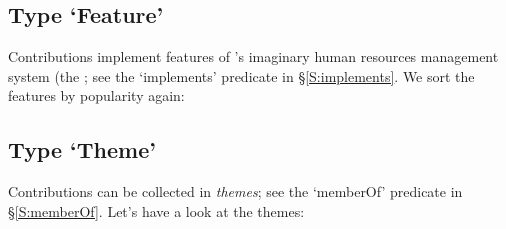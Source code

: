 

\subsection{Type `Feature'}

Contributions implement features of \ooo{}'s imaginary human resources
management system (the ; see the `implements' predicate in
\S\ref{S:implements}. We sort the features by popularity again:




\subsection{Type `Theme'}

Contributions can be collected in \emph{themes}; see the `memberOf'
predicate in \S\ref{S:memberOf}. Let's have a look at the themes:



